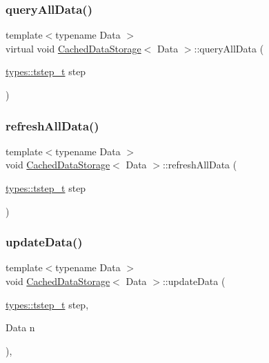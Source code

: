 \subsubsection{\texorpdfstring{queryAllData()}{queryAllData()}}
{\footnotesize\ttfamily template$<$typename Data $>$ \\
virtual void \mbox{\hyperlink{class_cached_data_storage}{Cached\+Data\+Storage}}$<$ Data $>$\+::query\+All\+Data (\begin{DoxyParamCaption}\item[{\mbox{\hyperlink{namespacetypes_a9dc53a5ce11a196d82a6983030de8028}{types\+::tstep\+\_\+t}}}]{step }\end{DoxyParamCaption})\hspace{0.3cm}{\ttfamily [pure virtual]}}

\mbox{\label{class_cached_data_storage_a81f4ab2c55c8f5c2632db2dc27bcf5b5}} 
\subsubsection{\texorpdfstring{refreshAllData()}{refreshAllData()}}
{\footnotesize\ttfamily template$<$typename Data $>$ \\
void \mbox{\hyperlink{class_cached_data_storage}{Cached\+Data\+Storage}}$<$ Data $>$\+::refresh\+All\+Data (\begin{DoxyParamCaption}\item[{\mbox{\hyperlink{namespacetypes_a9dc53a5ce11a196d82a6983030de8028}{types\+::tstep\+\_\+t}}}]{step }\end{DoxyParamCaption})\hspace{0.3cm}{\ttfamily [inline]}}

\mbox{\label{class_cached_data_storage_a12f747193f32aa3b28a6058fb157b693}} 
\subsubsection{\texorpdfstring{updateData()}{updateData()}}
{\footnotesize\ttfamily template$<$typename Data $>$ \\
void \mbox{\hyperlink{class_cached_data_storage}{Cached\+Data\+Storage}}$<$ Data $>$\+::update\+Data (\begin{DoxyParamCaption}\item[{\mbox{\hyperlink{namespacetypes_a9dc53a5ce11a196d82a6983030de8028}{types\+::tstep\+\_\+t}}}]{step,  }\item[{Data}]{n }\end{DoxyParamCaption})\hspace{0.3cm}{\ttfamily [inline]}, {\ttfamily [protected]}}



